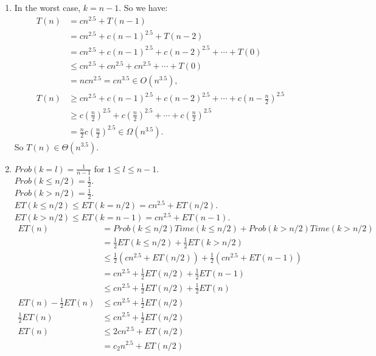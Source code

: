 \documentclass[10pt,oneside,reqno]{amsart}
\theoremstyle{plain}
\theoremstyle{definition}
\begin{document}
\begin{enumerate}[label=\arabic*.]
\begin{enumerate}
\item In the worst case, $k = n - 1$. So we have:
\begin{equation}
\begin{aligned}
T(n) &= cn^{2.5} + T(n - 1)\\
&= cn^{2.5} + c(n - 1)^{2.5} +  T(n - 2)\\
&= cn^{2.5} + c(n - 1)^{2.5} + c(n - 2)^{2.5} + \cdots + T(0)\\
&\leq cn^{2.5} + cn^{2.5} + cn^{2.5} + \cdots + T(0)\\
&= ncn^{2.5} = cn^{3.5} \in O(n^{3.5}),\\
T(n) &\geq cn^{2.5} + c(n - 1)^{2.5} + c(n - 2)^{2.5} + \cdots + c(n - \frac{n}{2})^{2.5}\\
&\geq c\left(\frac{n}{2}\right)^{2.5} + c\left(\frac{n}{2}\right)^{2.5} + \cdots + c\left(\frac{n}{2}\right)^{2.5}\\
&= \frac{n}{2}c\left(\frac{n}{2}\right)^{2.5} \in \Omega(n^{3.5}). 
\end{aligned}
\end{equation}
So $T(n) \in \Theta(n^{3.5})$. 
\item $Prob(k = l) = \frac{1}{n - 1}$ for  $1 \leq l \leq n - 1$. \\
$Prob(k \leq n/2) = \frac{1}{2}$. \\
$Prob(k > n/2) = \frac{1}{2}$. \\
$ET(k \leq n/2) \leq ET(k = n/2) = cn^{2.5} + ET(n/2)$. \\
$ET(k > n/2) \leq ET(k = n -1) = cn^{2.5} + ET(n - 1)$. \\
\begin{equation}
\begin{aligned}
ET(n) &= Prob(k \leq n/2)Time(k \leq n/2) + Prob(k > n/2)Time(k > n/2)\\
&= \frac{1}{2}ET(k \leq n/2)  + \frac{1}{2}ET(k > n/2)\\
&\leq \frac{1}{2}(cn^{2.5} + ET(n/2))  + \frac{1}{2}(cn^{2.5} + ET(n - 1))\\
&= cn^{2.5} + \frac{1}{2}ET(n/2) + \frac{1}{2}ET(n - 1)\\
&\leq cn^{2.5} + \frac{1}{2}ET(n/2) + \frac{1}{2}ET(n)\\
ET(n) - \frac{1}{2}ET(n) &\leq cn^{2.5} + \frac{1}{2}ET(n/2) \\
\frac{1}{2}ET(n) &\leq cn^{2.5} + \frac{1}{2}ET(n/2)\\
ET(n) &\leq 2cn^{2.5} + ET(n/2)\\
&= c_2n^{2.5} + ET(n/2)\\

\end{aligned}
\end{equation}
\end{enumerate}
\end{enumerate}
\end{document}

